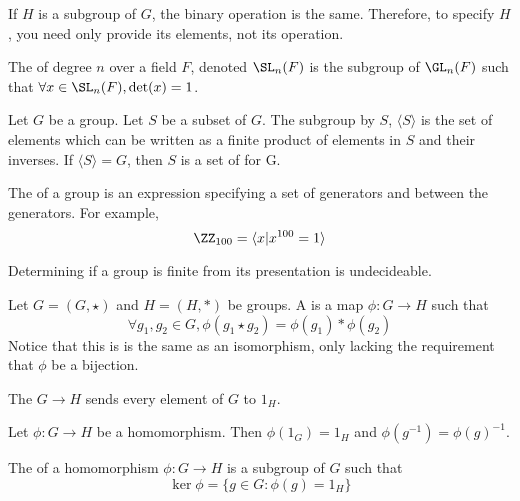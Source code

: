 \documentclass{article}
\begin{document}
\begin{remark}
  If $H$ is a subgroup of $G$, the binary operation is the same. Therefore,
  to specify $H$, you need only provide its elements, not its operation. 
\end{remark}

\begin{defn}
  The  of degree $n$ over a field $F$, denoted $\SL_n(F)$
  is the subgroup of $\GL_n(F)$ such that $\forall x \in \SL_n(F), \det(x) = 1$.
\end{defn}

\begin{defn}
  Let $G$ be a group. Let $S$ be a subset of $G$. The subgroup  by
  $S$, $\langle S \rangle$ is the set of elements which can be written as a finite
  product of elements in $S$ and their inverses. If $\langle S \rangle = G$,
  then $S$ is a set of  for G. 
\end{defn}

\begin{defn}
  The  of a group is an expression specifying a
  set of generators and  between the generators. For example,
  $$\ZZ_{100} = \langle x | x^{100} = 1 \rangle$$
\end{defn}

\begin{remark}
  Determining if a group is finite from its presentation is undecideable.
\end{remark}

\begin{defn}
  Let $G = (G, \star)$ and $H = (H, *)$ be groups. A 
  is a map $\phi : G \rightarrow H$ such that
  $$\forall g_1, g_2 \in G, \phi(g_1 \star g_2) = \phi(g_1) * \phi(g_2)$$
  Notice that this is is the same as an isomorphism, only lacking the requirement that
  $\phi$ be a bijection. 
\end{defn}

\begin{defn}
  The  $G \rightarrow H$ sends every element of $G$ to $1_H$.
\end{defn}

\begin{fact}
  Let $\phi : G \rightarrow H$ be a homomorphism. Then $\phi(1_G) = 1_H$ and
  $\phi(g^{-1}) = \phi(g)^{-1}$.
\end{fact}

\begin{defn}
  The  of a homomorphism $\phi : G \rightarrow H$ is a subgroup of $G$ such that
  $$\ker \phi = \{g \in G : \phi(g) = 1_H\}$$
\end{defn}
\end{document}

